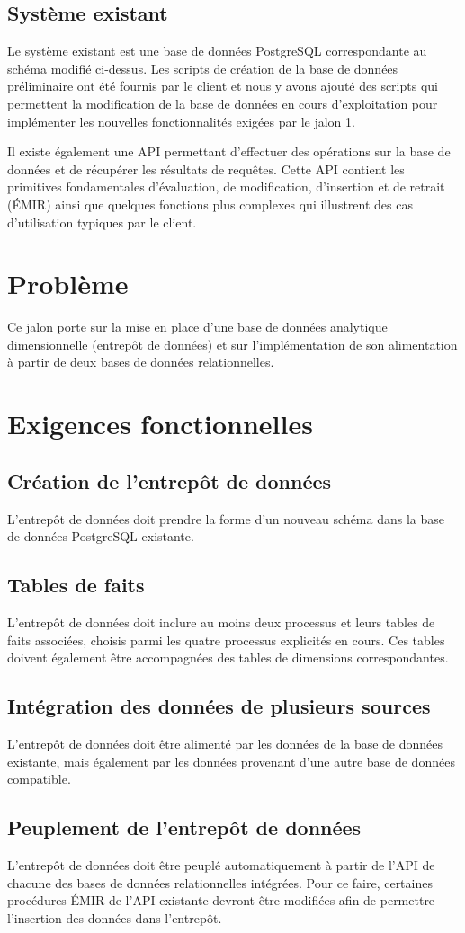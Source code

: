 \documentclass{article}
\begin{document}
\subsection{Système existant}
Le système existant est une base de données PostgreSQL correspondante
au schéma modifié ci-dessus. Les scripts de création de la base de données préliminaire
ont été fournis par le client et nous y avons ajouté des scripts qui
permettent la modification de la base de données en cours d'exploitation
pour implémenter les nouvelles fonctionnalités exigées par le jalon 1.

Il existe également une API permettant d'effectuer des opérations sur la base de données
et de récupérer les résultats de requêtes. Cette API contient les primitives
fondamentales d'évaluation, de modification, d'insertion et de retrait (ÉMIR) ainsi que
quelques fonctions plus complexes qui illustrent des cas d'utilisation typiques par le client.

\section{Problème}
Ce jalon porte sur la mise en place d'une base de données
analytique dimensionnelle (entrepôt de données) et sur l'implémentation
de son alimentation à partir de deux bases de données relationnelles.

\section{Exigences fonctionnelles}
\subsection{Création de l'entrepôt de données}
L'entrepôt de données doit prendre la forme d'un nouveau schéma dans 
la base de données PostgreSQL existante.

\subsection{Tables de faits}
L'entrepôt de données doit inclure au moins deux processus et leurs tables
de faits associées, choisis parmi les quatre processus explicités en cours.
Ces tables doivent également être accompagnées des tables de dimensions
correspondantes.

\subsection{Intégration des données de plusieurs sources}
L'entrepôt de données doit être alimenté par les données de la base de données
existante, mais également par les données provenant d'une autre base de données
compatible.

\subsection{Peuplement de l'entrepôt de données}
L'entrepôt de données doit être peuplé automatiquement à partir de l'API
de chacune des bases de données relationnelles intégrées.
Pour ce faire, certaines procédures ÉMIR de l'API existante devront être modifiées
afin de permettre l'insertion des données dans l'entrepôt.
\end{document}
